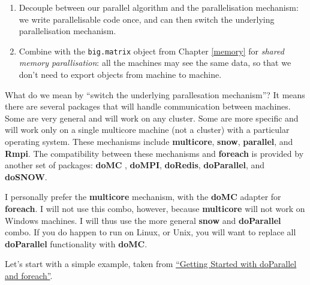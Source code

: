 \documentclass[]{book}
\newenvironment{Shaded}{\begin{snugshade}}{\end{snugshade}}
\newcommand{\KeywordTok}[1]{\textcolor[rgb]{0.13,0.29,0.53}{\textbf{#1}}}
\newcommand{\DataTypeTok}[1]{\textcolor[rgb]{0.13,0.29,0.53}{#1}}
\newcommand{\DecValTok}[1]{\textcolor[rgb]{0.00,0.00,0.81}{#1}}
\newcommand{\StringTok}[1]{\textcolor[rgb]{0.31,0.60,0.02}{#1}}
\newcommand{\OperatorTok}[1]{\textcolor[rgb]{0.81,0.36,0.00}{\textbf{#1}}}
\newcommand{\NormalTok}[1]{#1}
\theoremstyle{definition}
\theoremstyle{definition}
\theoremstyle{definition}
\theoremstyle{remark}
\let\BeginKnitrBlock\begin \let\EndKnitrBlock\end
\begin{document}
\begin{enumerate}
\def\labelenumi{\arabic{enumi}.}
\item
  Decouple between our parallel algorithm and the parallelisation
  mechanism: we write parallelisable code once, and can then switch the
  underlying parallelisation mechanism.
\item
  Combine with the \texttt{big.matrix} object from Chapter \ref{memory}
  for \emph{shared memory parallisation}: all the machines may see the
  same data, so that we don't need to export objects from machine to
  machine.
\end{enumerate}

What do we mean by ``switch the underlying parallesation mechanism''? It
means there are several packages that will handle communication between
machines. Some are very general and will work on any cluster. Some are
more specific and will work only on a single multicore machine (not a
cluster) with a particular operating system. These mechanisms include
\textbf{multicore}, \textbf{snow}, \textbf{parallel}, and \textbf{Rmpi}.
The compatibility between these mechanisms and \textbf{foreach} is
provided by another set of packages: \textbf{doMC} , \textbf{doMPI},
\textbf{doRedis}, \textbf{doParallel}, and \textbf{doSNOW}.

\BeginKnitrBlock{remark}
{}I personally prefer the \textbf{multicore}
mechanism, with the \textbf{doMC} adapter for \textbf{foreach}. I will
not use this combo, however, because \textbf{multicore} will not work on
Windows machines. I will thus use the more general \textbf{snow} and
\textbf{doParallel} combo. If you do happen to run on Linux, or Unix,
you will want to replace all \textbf{doParallel} functionality with
\textbf{doMC}.
\EndKnitrBlock{remark}

Let's start with a simple example, taken from
\href{http://debian.mc.vanderbilt.edu/R/CRAN/web/packages/doParallel/vignettes/gettingstartedParallel.pdf}{``Getting
Started with doParallel and foreach''}.

\begin{Shaded}
\end{Shaded}
\end{document}
